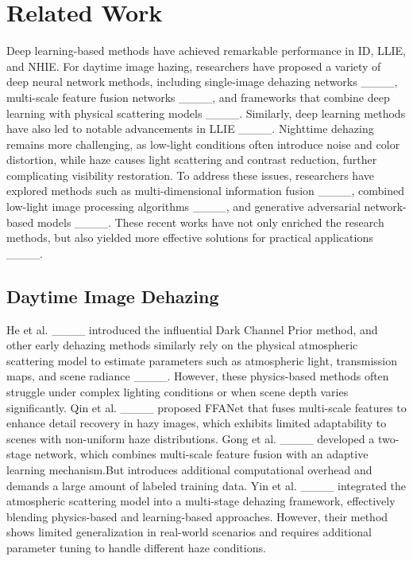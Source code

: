 \section{Related Work}
\label{sec:relatedwork}
%
    Deep learning-based methods have achieved remarkable performance in ID, LLIE, and NHIE. For daytime image hazing, researchers have proposed a variety of deep neural network methods, including single-image dehazing networks ____, multi-scale feature fusion networks ____, and frameworks that combine deep learning with physical scattering models ____. Similarly, deep learning methods have also led to notable advancements in LLIE ____. Nighttime dehazing remains more challenging, as low-light conditions often introduce noise and color distortion, while haze causes light scattering and contrast reduction, further complicating visibility restoration. To address these issues, researchers have explored methods such as multi-dimensional information fusion ____, combined low-light image processing algorithms ____, and generative adversarial network-based models ____. These recent works have not only enriched the research methods, but also yielded more effective solutions for practical applications ____.
%    
\subsection{Daytime Image Dehazing}
%
    He et al. ____ introduced the influential Dark Channel Prior method, and other early dehazing methods similarly rely on the physical atmospheric scattering model to estimate parameters such as atmospheric light, transmission maps, and scene radiance ____. However, these physics-based methods often struggle under complex lighting conditions or when scene depth varies significantly. Qin et al. ____ proposed FFANet that fuses multi-scale features to enhance detail recovery in hazy images, which exhibits limited adaptability to scenes with non-uniform haze distributions. Gong et al. ____ developed a two-stage network, which combines multi-scale feature fusion with an adaptive learning mechanism.But introduces additional computational overhead and demands a large amount of labeled training data. Yin et al. ____ integrated the atmospheric scattering model into a multi-stage dehazing framework, effectively blending physics-based and learning-based approaches. However, their method shows limited generalization in real-world scenarios and requires additional parameter tuning to handle different haze conditions.
%    

